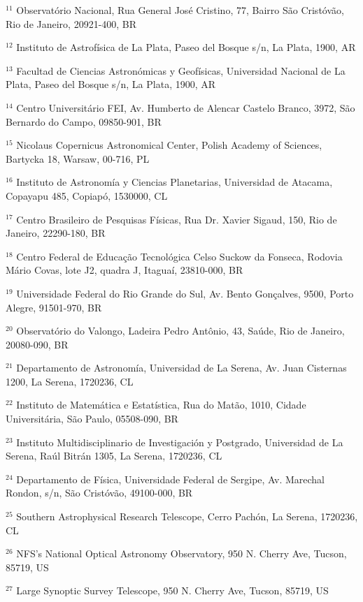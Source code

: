 \noindent
$^{11}$ Observatório Nacional, Rua General José Cristino, 77, Bairro São Cristóvão, Rio de Janeiro, 20921-400, BR

\noindent
$^{12}$ Instituto de Astrofísica de La Plata, Paseo del Bosque s/n, La Plata, 1900, AR

\noindent
$^{13}$ Facultad de Ciencias Astronómicas y Geofísicas, Universidad Nacional de La Plata, Paseo del Bosque s/n, La Plata, 1900, AR

\noindent
$^{14}$ Centro Universitário FEI, Av. Humberto de Alencar Castelo Branco, 3972, São Bernardo do Campo, 09850-901, BR

\noindent
$^{15}$ Nicolaus Copernicus Astronomical Center, Polish Academy of Sciences, Bartycka 18, Warsaw, 00-716, PL

\noindent
$^{16}$ Instituto de Astronomía y Ciencias Planetarias, Universidad de Atacama, Copayapu 485, Copiapó, 1530000, CL

\noindent
$^{17}$ Centro Brasileiro de Pesquisas Físicas, Rua Dr. Xavier Sigaud, 150, Rio de Janeiro, 22290-180, BR

\noindent
$^{18}$ Centro Federal de Educação Tecnológica Celso Suckow da Fonseca, Rodovia Mário Covas, lote J2, quadra J, Itaguaí, 23810-000, BR

\noindent
$^{19}$ Universidade Federal do Rio Grande do Sul, Av. Bento Gonçalves, 9500, Porto Alegre, 91501-970, BR

\noindent
$^{20}$ Observatório do Valongo, Ladeira Pedro Antônio, 43, Saúde, Rio de Janeiro, 20080-090, BR

\noindent
$^{21}$ Departamento de Astronomía, Universidad de La Serena, Av. Juan Cisternas 1200, La Serena, 1720236, CL

\noindent
$^{22}$ Instituto de Matemática e Estatística, Rua do Matão, 1010, Cidade Universitária, São Paulo, 05508-090, BR

\noindent
$^{23}$ Instituto Multidisciplinario de Investigación y Postgrado, Universidad de La Serena, Raúl Bitrán 1305, La Serena, 1720236, CL

\noindent
$^{24}$ Departamento de Física, Universidade Federal de Sergipe, Av. Marechal Rondon, s/n, São Cristóvão, 49100-000, BR

\noindent
$^{25}$ Southern Astrophysical Research Telescope, Cerro Pachón, La Serena, 1720236, CL

\noindent
$^{26}$ NFS's National Optical Astronomy Observatory, 950 N. Cherry Ave, Tucson, 85719, US

\noindent
$^{27}$ Large Synoptic Survey Telescope, 950 N. Cherry Ave, Tucson, 85719, US

